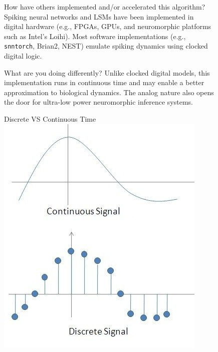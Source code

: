 \documentclass[final]{beamer}
\newlength{\sepwidth}
\newlength{\colwidth}
\newcommand{\separatorcolumn}{\begin{column}{\sepwidth}\end{column}}
\begin{document}
\begin{frame}[t]
\begin{columns}[t]
\begin{column}{\colwidth}
\end{column}
\separatorcolumn

\begin{column}{\colwidth}

\begin{block}{How have others implemented and/or accelerated this algorithm?}
Spiking neural networks and LSMs have been implemented in digital hardware (e.g., FPGAs, GPUs, and neuromorphic platforms such as Intel's Loihi). Most software implementations (e.g., \texttt{snntorch}, Brian2, NEST) emulate spiking dynamics using clocked digital logic. 
\end{block}


\begin{block}{What are you doing differently?}
Unlike clocked digital models, this implementation runs in continuous time and may enable a better approximation to biological dynamics. The analog nature also opens the door for ultra-low power neuromorphic inference systems.
\end{block}

\begin{block}{Discrete VS Continuous Time}
\centering
\includegraphics[width=0.9\colwidth]{time.jpg} \\
\end{block}

\end{column}
\separatorcolumn

\begin{column}{\colwidth}


\end{column}
\end{columns}
\end{frame}
\end{document}
